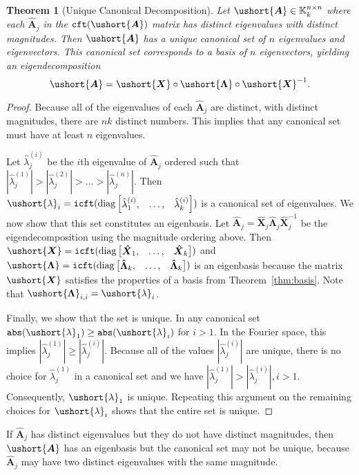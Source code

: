 \documentclass[1p,authoryear,letterpaper]{elsarticle}
\newtheorem{theorem}{Theorem}
\DeclareMathOperator{\tabs}{\texttt{abs}}
\providecommand{\KK}{\mathbb{K}}
\providecommand{\bmat}[1]{\begin{bmatrix} #1 \end{bmatrix}}
\providecommand{\mat}{\boldsymbol}
\providecommand{\mhat}[1]{\ensuremath{\mat{\hat{#1}}}}
\providecommand{\mAhat}{\mhat{A}}
\DeclareMathOperator{\fft}{\texttt{cft}}
\DeclareMathOperator{\icft}{\texttt{icft}}
\newcommand{\cel}[1]{\ushort{#1}}
\newcommand{\celm}[1]{\cel{\mat{#1}}}
\newcommand{\clambda}{\ensuremath{\cel{\lambda}}}
\providecommand{\cmA}{\ensuremath{\celm{A}}}
\providecommand{\cmX}{\ensuremath{\celm{X}}}
\newcommand{\mLambdahat}{\mat{\hat{\Lambda}}}
\newcommand{\mXhat}{\mat{\hat{X}}}
\providecommand{\cmLambda}{\ensuremath{\celm{\Lambda}}}
\begin{document}
\begin{theorem}[Unique Canonical Decomposition] \label{thm:canonical}
 Let $\cmA \in \KK_k^{n \times n}$ where each $\mAhat_j$ in
 the $\fft(\cmA)$ matrix has distinct eigenvalues with distinct
 magnitudes.
 Then $\cmA$ has a unique canonical set of $n$ eigenvalues
 and eigenvectors.
 This canonical set corresponds to a basis of $n$ eigenvectors, yielding
 an eigendecomposition \[ \cmA = \cmX \circ \cmLambda \circ \cmX^{-1} . \]
\end{theorem}
\begin{proof}
Because all of the eigenvalues of
each $\mAhat_j$ are distinct, with distinct magnitudes, there
are $nk$ distinct numbers.  This implies that any canonical
set must have at least $n$ eigenvalues.

Let $\hat{\lambda}_j^{(i)}$ be the $i$th eigenvalue of $\mAhat_j$
ordered such that $|\hat{\lambda}_j^{(1)}| > |\hat{\lambda}_j^{(2)}| >
\ldots > |\hat{\lambda}_j^{(n)}|$.  Then $\clambda_i = \icft (
\diag \bmat{ \hat{\lambda}_1^{(i)}, & \ldots, & \hat{\lambda}_k^{(i)} } )$
is a canonical set of eigenvalues.  We now show that this set
constitutes an eigenbasis.
Let $\mAhat_j = \mXhat_j \mLambdahat_j \mXhat_j^{-1}$ be
the eigendecomposition using the magnitude ordering above.
Then $\cmX = \icft( \diag \bmat{ \mXhat_1, & \ldots, & \mXhat_k} )$
and $\cmLambda = \icft( \diag \bmat{ \mLambdahat_k, & \ldots, & \mLambdahat_k} )$
is an eigenbasis because the matrix $\cmX$ satisfies the
properties of a basis from Theorem~\ref{thm:basis}.
Note that $\cmLambda_{i,i} = \clambda_i$.

Finally, we show that the set is unique. In any canonical
set $\tabs(\clambda_1) \ge \tabs(\clambda_i)$ for $i > 1$.
In the Fourier space, this implies
$|\hat{\lambda}_j^{(1)}| \ge |\hat{\lambda}_j^{(i)}|$.  Because
all of the values $|\hat{\lambda}_j^{(i)}|$ are unique, there
is no choice for $\hat{\lambda}_j^{(1)}$ in a canonical set
and we have $|\hat{\lambda}_j^{(1)}| > |\hat{\lambda}_j^{(i)}|, i > 1$.
Consequently, $\clambda_1$ is unique.  Repeating this
argument on the remaining choices for $\clambda_i$
shows that the entire set is unique.
\end{proof}
\begin{remark} If $\mAhat_j$ has distinct eigenvalues but they do not have distinct
magnitudes, then $\cmA$ has an eigenbasis but the canonical
 set may not be unique, because $\mAhat_j$ may have two distinct eigenvalues
 with the same magnitude.
\end{remark}
\end{document}
